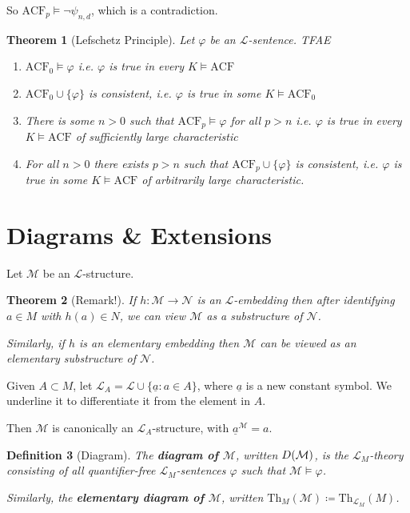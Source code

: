 \documentclass[]{article}
\theoremstyle{custhm}
\newtheorem{theorem}{Theorem}[section]
\theoremstyle{cusdef}
\newtheorem{defin}[theorem]{Definition}
\theoremstyle{custhm}
\theoremstyle{custhm}
\theoremstyle{custhm}
\theoremstyle{ex}
\theoremstyle{custhm}
\theoremstyle{cusdef}
\theoremstyle{remark}
\newcommand{\ra}{\rightarrow}
\newcommand{\undf}[1]{\textit{\textbf{#1}}}
\renewcommand{\L}{\mathcal{L}}
\renewcommand{\it}[1]{\textit{#1}}
\newcommand{\M}{\mathcal{M}}
\renewcommand{\phi}{\varphi}
\newcommand{\Th}{\textrm{Th}}
\newcommand{\N}{\mathcal{N}}
\newcommand{\acf}{\textrm{ACF}}
\newcommand{\D}{\mathcal{D}}
\begin{document}
So $\acf_p\models \neg\psi_{n,d}$, which is a contradiction.
\begin{theorem}[Lefschetz Principle]
Let $\phi$ be an $\L$-sentence. TFAE
\begin{enumerate}[label=(\arabic*)]
	\item $\acf_0\models \phi$ {\it i.e.} $\phi$ is true in every $K\models \acf$
	\item $\acf_0\cup\{\phi\}$ is consistent, {\it i.e.} $\phi$ is true in some $K\models \acf_0$
	\item There is some $n > 0$ such that $\acf_p\models\phi$ for all $p > n$ {\it i.e.} $\phi$ is true in every $K\models \acf$ of sufficiently large characteristic
	\item For all $n > 0$ there exists $p > n$ such that $\acf_p\cup\{\phi\}$ is consistent, {\it i.e.} $\phi$ is true in some $K\models \acf$ of arbitrarily large characteristic.
\end{enumerate}
\end{theorem}


\section{Diagrams \& Extensions}

Let $\M$ be an $\L$-structure.

\begin{theorem}[Remark!]
If $h:\M\ra\N$ is an $\L$-embedding then after identifying $a\in M$ with $h(a) \in N$, we can view $\M$ as a substructure of $\N$.

Similarly, if $h$ is an elementary embedding then $\M$ can be viewed as an elementary substructure of $\N$.
\end{theorem}

Given $A\subset M$, let $\L_A = \L\cup\{\underline{a}:a\in A\}$, where $\underline{a}$ is a new constant symbol. We underline it to differentiate it from the element in $A$.

Then $\M$ is canonically an $\L_A$-structure, with $\underline{a}^\M = a$.

\begin{defin}[Diagram]
The \undf{diagram of $\M$}, written $\\D(\M)$, is the $\L_M$-theory consisting of all quantifier-free $\L_M$-sentences $\phi$ such that $\M\models \phi$.

Similarly, the \undf{elementary diagram of $\M$}, written $\Th_M(\M)\coloneqq \Th_{\L_M}(M)$.
\end{defin}
\end{document}
